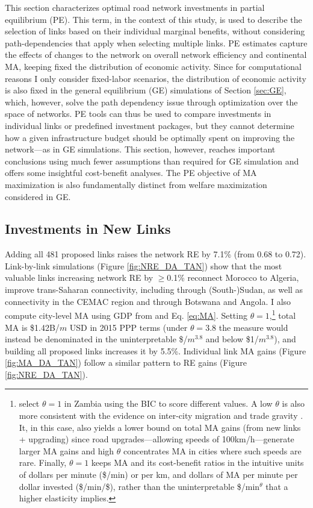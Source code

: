 \documentclass[a4paper]{article}
\begin{document}
This section characterizes optimal road network investments in partial equilibrium (PE). This term, in the context of this study, is used to describe the selection of links based on their individual marginal benefits, without considering path-dependencies that apply when selecting multiple links. PE estimates capture the effects of changes to the network on overall network efficiency and continental MA, keeping fixed the distribution of economic activity. Since for computational reasons I only consider fixed-labor scenarios, the distribution of economic activity is also fixed in the general equilibrium (GE) simulations of Section \ref{sec:GE}, which, however, solve the path dependency issue through optimization over the space of networks. PE tools can thus be used to compare investments in individual links or predefined investment packages, but they cannot determine how a given infrastructure budget should be optimally spent on improving the network---as in GE simulations. This section, however, reaches important conclusions using much fewer assumptions than required for GE simulation and offers some insightful cost-benefit analyses. The PE objective of MA maximization is also fundamentally distinct from welfare maximization considered in GE. 


\subsection{Investments in New Links} \label{sec:IINL}

Adding all 481 proposed links raises the network RE by 7.1\% (from 0.68 to 0.72). Link-by-link simulations (Figure \ref{fig:NRE_DA_TAN}) show that the most valuable links increasing network RE by $\geq$0.1\% reconnect Morocco to Algeria, improve trans-Saharan connectivity, including through (South-)Sudan, as well as connectivity in the CEMAC region and through Botswana and Angola. I also compute city-level MA using GDP from \citet{kummu2018gridded} and Eq. \ref{eq:MA}. Setting $\theta = 1$,\footnote{\citet{Peng2021} select $\theta = 1$ in Zambia using the BIC to score different values. A low $\theta$ is also more consistent with the evidence on inter-city migration \citep{poot2016gravity, zipf1946p} and trade gravity \citep{head2014gravity}. It, in this case, also yields a lower bound on total MA gains (from new links + upgrading) since road upgrades---allowing speeds of 100km/h---generate larger MA gains and high $\theta$ concentrates MA in cities where such speeds are rare. Finally, $\theta = 1$ keeps MA and its cost-benefit ratios in the intuitive units of dollars per minute (\$/min) or per km, and dollars of MA per minute per dollar invested (\$/min/\$), rather than the uninterpretable \$/min$^\theta$ that a higher elasticity implies.} total MA is \$1.42B/$m$ USD in 2015 PPP terms (under $\theta = 3.8$ the measure would instead be denominated in the uninterpretable \$/$m^{3.8}$ and below \$1/$m^{3.8}$), and building all proposed links increases it by 5.5\%. Individual link MA gains (Figure \ref{fig:MA_DA_TAN}) follow a similar pattern to RE gains (Figure \ref{fig:NRE_DA_TAN}). \newline
\end{document}
